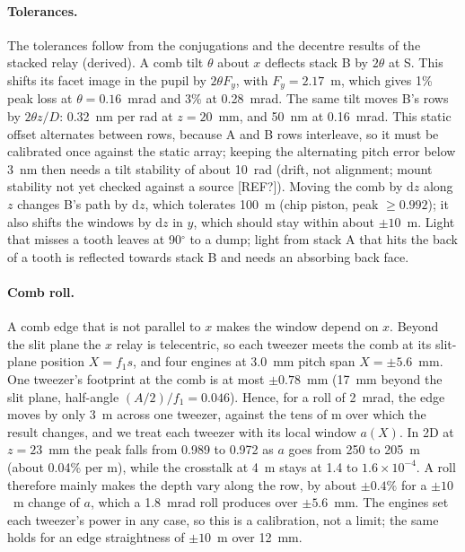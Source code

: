 \paragraph{Tolerances.} The tolerances follow from the conjugations and the decentre results of the stacked relay (derived). A comb tilt $\theta$ about $x$ deflects stack B by $2\theta$ at S. This shifts its facet image in the pupil by $2\theta F_y$, with $F_y=2.17$~m, which gives 1\% peak loss at $\theta=0.16$~mrad and 3\% at 0.28~mrad. The same tilt moves B's rows by $2\theta z/D$: 0.32~nm per \textmu rad at $z=20$~mm, and 50~nm at 0.16~mrad. This static offset alternates between rows, because A and B rows interleave, so it must be calibrated once against the static array; keeping the alternating pitch error below 3~nm then needs a tilt stability of about 10~\textmu rad (drift, not alignment; mount stability not yet checked against a source [REF?]). Moving the comb by $\mathrm{d}z$ along $z$ changes B's path by $\mathrm{d}z$, which tolerates 100~\textmu m (chip piston, peak $\geq0.992$); it also shifts the windows by $\mathrm{d}z$ in $y$, which should stay within about $\pm10$~\textmu m. Light that misses a tooth leaves at 90$^\circ$ to a dump; light from stack A that hits the back of a tooth is reflected towards stack B and needs an absorbing back face.

\paragraph{Comb roll.} A comb edge that is not parallel to $x$ makes the window depend on $x$. Beyond the slit plane the $x$ relay is telecentric, so each tweezer meets the comb at its slit-plane position $X=f_1 s$, and four engines at 3.0~mm pitch span $X=\pm5.6$~mm. One tweezer's footprint at the comb is at most $\pm0.78$~mm (17~mm beyond the slit plane, half-angle $(A/2)/f_1=0.046$). Hence, for a roll of 2~mrad, the edge moves by only 3~\textmu m across one tweezer, against the tens of \textmu m over which the result changes, and we treat each tweezer with its local window $a(X)$. In 2D at $z=23$~mm the peak falls from 0.989 to 0.972 as $a$ goes from 250 to 205~\textmu m (about 0.04\% per \textmu m), while the crosstalk at 4~\textmu m stays at 1.4 to $1.6\times10^{-4}$. A roll therefore mainly makes the depth vary along the row, by about $\pm0.4\%$ for a $\pm10$~\textmu m change of $a$, which a 1.8~mrad roll produces over $\pm5.6$~mm. The engines set each tweezer's power in any case, so this is a calibration, not a limit; the same holds for an edge straightness of $\pm10$~\textmu m over 12~mm.

